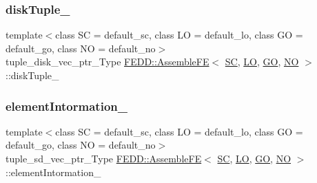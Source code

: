 \subsubsection{\texorpdfstring{disk\+Tuple\+\_\+}{diskTuple\_}}
{\footnotesize\ttfamily template$<$class SC  = default\+\_\+sc, class LO  = default\+\_\+lo, class GO  = default\+\_\+go, class NO  = default\+\_\+no$>$ \\
tuple\+\_\+disk\+\_\+vec\+\_\+ptr\+\_\+\+Type \hyperlink{classFEDD_1_1AssembleFE}{F\+E\+D\+D\+::\+Assemble\+FE}$<$ \hyperlink{fe__test__laplace_8cpp_a79c7e86a57edbb2a5a53242bcd04e41e}{SC}, \hyperlink{fe__test__laplace_8cpp_ad6a38c9f07d3fd633eefca5bccad8410}{LO}, \hyperlink{fe__test__laplace_8cpp_afa2946b509009b4f45eb04bd8c5b27d9}{GO}, \hyperlink{fe__test__laplace_8cpp_a5e24f37b28787429872b6ecb1d0417ce}{NO} $>$\+::disk\+Tuple\+\_\+\hspace{0.3cm}{\ttfamily [protected]}}

\mbox{\label{classFEDD_1_1AssembleFE_a75ac3bec40089aca4566313ae7dd2650}} 
\subsubsection{\texorpdfstring{element\+Intormation\+\_\+}{elementIntormation\_}}
{\footnotesize\ttfamily template$<$class SC  = default\+\_\+sc, class LO  = default\+\_\+lo, class GO  = default\+\_\+go, class NO  = default\+\_\+no$>$ \\
tuple\+\_\+sd\+\_\+vec\+\_\+ptr\+\_\+\+Type \hyperlink{classFEDD_1_1AssembleFE}{F\+E\+D\+D\+::\+Assemble\+FE}$<$ \hyperlink{fe__test__laplace_8cpp_a79c7e86a57edbb2a5a53242bcd04e41e}{SC}, \hyperlink{fe__test__laplace_8cpp_ad6a38c9f07d3fd633eefca5bccad8410}{LO}, \hyperlink{fe__test__laplace_8cpp_afa2946b509009b4f45eb04bd8c5b27d9}{GO}, \hyperlink{fe__test__laplace_8cpp_a5e24f37b28787429872b6ecb1d0417ce}{NO} $>$\+::element\+Intormation\+\_\+\hspace{0.3cm}{\ttfamily [protected]}}

\mbox{\label{classFEDD_1_1AssembleFE_a222f91cd1b4296d37a520e510692ca8e}} 
